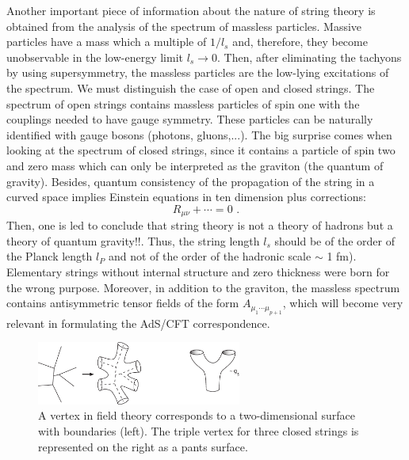 \documentclass[12pt,notitlepage]{article}
\newcommand{\beq}{\begin{equation}}
\newcommand{\eeq}{\end{equation}}
\begin{document}
Another important piece of information about the nature of string theory is obtained from the analysis of the spectrum of massless particles. Massive particles have a mass which a multiple of $1/l_s$ and, therefore, they become unobservable in the low-energy limit $l_s\to 0$. Then, after eliminating the tachyons by using supersymmetry, the massless particles are the low-lying excitations of the spectrum. We must distinguish the case of open and closed strings. The spectrum of open strings contains massless particles of spin one with the couplings needed to have gauge symmetry. These particles can be naturally identified with gauge bosons (photons, gluons,...). The big surprise comes when looking at the spectrum of  closed strings, since  it contains a particle of spin two and zero mass which can only be interpreted as the graviton (the quantum of gravity). Besides, quantum consistency of the propagation of the string in a curved space implies Einstein equations in ten dimension plus corrections:
\beq
R_{\mu\nu}+\cdots=0\,\,.
\eeq
Then, one is led to conclude that string theory is not a theory of hadrons but a  theory of quantum gravity!!.  Thus, the string length $l_s$ should be of the order of the Planck length $l_P$ and not of the order of the hadronic scale $\sim$ 1 fm).  Elementary strings without internal structure and zero thickness were born for the wrong purpose. Moreover, in addition to the graviton, the massless spectrum contains antisymmetric tensor fields of the form $A_{\mu_1\cdots\mu_{p+1}}$, which will become very relevant in formulating the AdS/CFT correspondence. 

\begin{figure}[ht]
\center
\includegraphics[width=0.6\textwidth]{Pant2.pdf}
\caption{A vertex in field theory corresponds to a two-dimensional surface with boundaries (left). The triple vertex for three closed strings is represented  on the right as a pants surface. } 
\label{thick_and_triple_vertex}
\end{figure}
\end{document}
